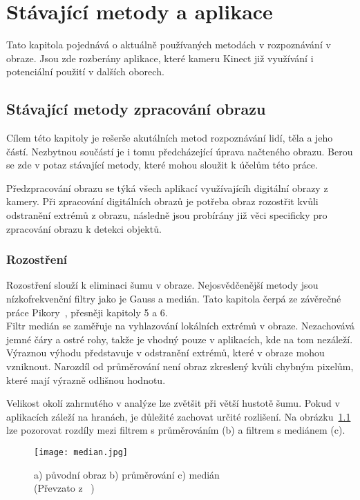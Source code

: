
\textit{}\chapter{Stávající metody a aplikace}
Tato kapitola pojednává o aktuálně používaných metodách v rozpoznávání v obraze. Jsou zde rozberány aplikace, které kameru Kinect již využívání i potenciální použití v dalších oborech.

\section{Stávající metody zpracování obrazu}
Cílem této kapitoly je rešerše akutálních metod rozpoznávání lidí, těla a jeho částí. Nezbytnou součástí je i tomu předcházející úprava načteného obrazu. Berou se zde v potaz stávající metody, které mohou sloužit k účelům této práce.

Předzpracování obrazu se týká všech aplikací využívajícíh digitální obrazy z kamery. Při zpracování digitálních obrazů je potřeba obraz rozostřit kvůli odstranění extrémů z obrazu, následně jsou probírány již věci specificky pro zpracování obrazu k detekci objektů.

\subsection{Rozostření}
Rozostření slouží k eliminaci šumu v obraze. Nejosvědčenější metody jsou nízkofrekvenční filtry jako je Gauss a medián. Tato kapitola čerpá ze závěrečné práce Pikory~\cite{15}, přesněji kapitoly 5 a 6.\\

Filtr medián se zaměřuje na vyhlazování lokálních extrémů v obraze. Nezachovává jemné čáry a ostré rohy, takže je vhodný pouze v aplikacích, kde na tom nezáleží. Výraznou výhodu představuje v odstranění extrémů, které v obraze mohou vzniknout. Narozdíl od průměrování není obraz zkreslený kvůli chybným pixelům, které mají výrazně odlišnou hodnotu.
 
Velikost okolí zahrnutého v analýze lze zvětšit při větší hustotě šumu. Pokud v aplikacích záleží na hranách, je důležité zachovat určité rozlišení. Na obrázku~\ref{pic1} lze pozorovat rozdíly mezi filtrem s průměrováním (b) a filtrem s mediánem (c).\\

\begin{figure}[h]
\centering
\texttt{[image: median.jpg]}
\caption{a) původní obraz b) průměrování c) medián\\
 (Převzato z ~\cite{15}) }
 \label{pic1}
\end{figure}

